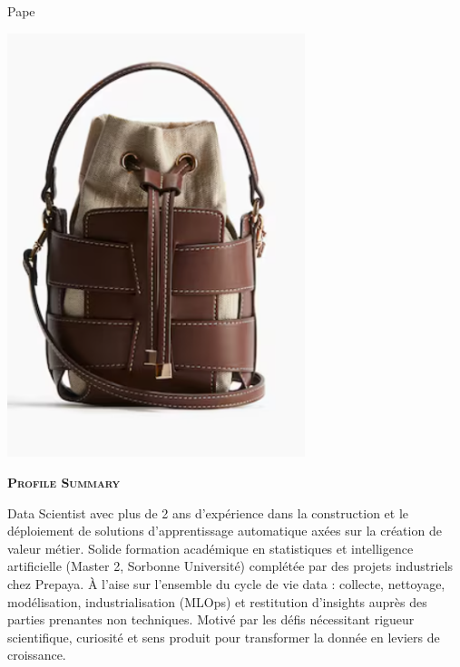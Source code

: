 \documentclass[11pt,a4paper]{article}
\newcommand{\headleft}[1]{\vspace*{3ex}\textsc{\textbf{#1}}\par%
    \vspace*{-1.5ex}\hrulefill\par\vspace*{0.7ex}}
\begin{document}
\setlength{\topskip}{0pt}\setlength{\parindent}{0pt}\setlength{\parskip}{0pt}
\setlength{\fboxsep}{0pt}\pagestyle{empty}\raggedbottom

\begin{minipage}[t]{0.33\textwidth}
\colorbox{cvblue}{\begin{minipage}[t][5mm][t]{\textwidth}\null\hfill\null\end{minipage}}
\vspace{-.2ex}
\colorbox{cvblue!90}{\color{white}
\textwidth
\begin{minipage}[t][293mm][t]{0.82\textwidth}\raggedright
\vspace*{2.5ex}

\Large Pape \textbf{\textscFALL} \normalsize


\null\hfill\includegraphics[width=0.65\textwidth]{ e49a550c4ff84b529489897bbe6b772e.png }\hfill\null


\vspace*{0.5ex}

\headleft{Profile Summary}
Data Scientist avec plus de 2 ans d’expérience dans la construction et le déploiement de solutions d’apprentissage automatique axées sur la création de valeur métier. Solide formation académique en statistiques et intelligence artificielle (Master 2, Sorbonne Université) complétée par des projets industriels chez Prepaya. À l’aise sur l’ensemble du cycle de vie data : collecte, nettoyage, modélisation, industrialisation (MLOps) et restitution d’insights auprès des parties prenantes non techniques. Motivé par les défis nécessitant rigueur scientifique, curiosité et sens produit pour transformer la donnée en leviers de croissance.


\end{minipage}}
\end{minipage}
\end{document}
